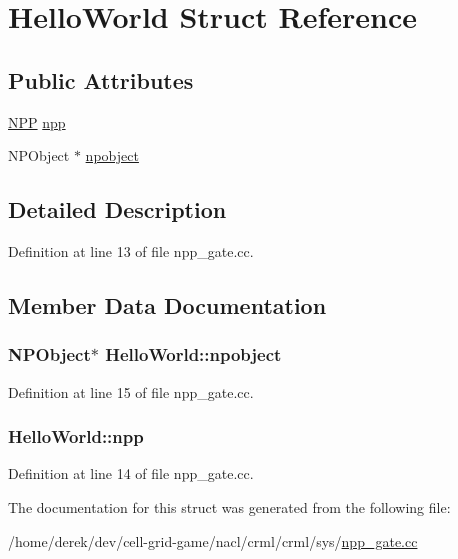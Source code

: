 \hypertarget{struct_hello_world}{
\section{HelloWorld Struct Reference}
\label{struct_hello_world}
}
\subsection*{Public Attributes}
\begin{DoxyCompactItemize}
\item 
\hyperlink{struct___n_p_p}{NPP} \hyperlink{struct_hello_world_a8546fa606713a22cd373527986469eba}{npp}
\item 
NPObject $\ast$ \hyperlink{struct_hello_world_ab53916603277423408f4e4997b3b5733}{npobject}
\end{DoxyCompactItemize}


\subsection{Detailed Description}


Definition at line 13 of file npp\_\-gate.cc.



\subsection{Member Data Documentation}
\hypertarget{struct_hello_world_ab53916603277423408f4e4997b3b5733}{
\subsubsection[{npobject}]{\setlength{\rightskip}{0pt plus 5cm}NPObject$\ast$ {\bf HelloWorld::npobject}}}
\label{struct_hello_world_ab53916603277423408f4e4997b3b5733}


Definition at line 15 of file npp\_\-gate.cc.

\hypertarget{struct_hello_world_a8546fa606713a22cd373527986469eba}{
\subsubsection[{npp}]{ {\bf HelloWorld::npp}}}
\label{struct_hello_world_a8546fa606713a22cd373527986469eba}


Definition at line 14 of file npp\_\-gate.cc.



The documentation for this struct was generated from the following file:\begin{DoxyCompactItemize}
\item 
/home/derek/dev/cell-\/grid-\/game/nacl/crml/crml/sys/\hyperlink{sys_2npp__gate_8cc}{npp\_\-gate.cc}\end{DoxyCompactItemize}
